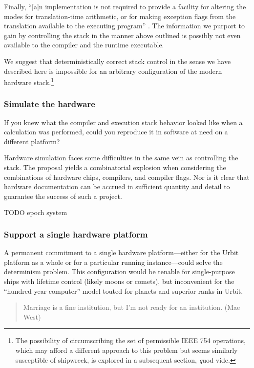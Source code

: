 \documentclass[twoside]{article}
\begin{document}
Finally, “[a]n implementation is not required to provide a facility for altering the modes for translation-time arithmetic, or for making exception flags from the translation available to the executing program” \citep[p.~200]{Jones2008}.  The information we purport to gain by controlling the stack in the manner above outlined is possibly not even available to the compiler and the runtime executable.

We suggest that deterministically correct stack control in the sense we have described here is impossible for an arbitrary configuration of the modern hardware stack.\footnote{The possibility of circumscribing the set of permissible IEEE 754 operations, which may afford a different approach to this problem but seems similarly susceptible of shipwreck, is explored in a subsequent section, {\emph quod vide}.}

\subsubsection{Simulate the hardware}

If you knew what the compiler and execution stack behavior looked like when a calculation was performed, could you reproduce it in software at need on a different platform?

Hardware simulation faces some difficulties in the same vein as controlling the stack.  The proposal yields a combinatorial explosion when considering the combinations of hardware chips, compilers, and compiler flags.  Nor is it clear that hardware documentation can be accrued in sufficient quantity and detail to guarantee the success of such a project.

TODO
epoch system

\subsubsection{Support a single hardware platform}

A permanent commitment to a single hardware platform—either for the Urbit platform as a whole or for a particular running instance—could solve the determinism problem.  This configuration would be tenable for single-purpose ships with lifetime control (likely moons or comets), but inconvenient for the “hundred-year computer” model touted for planets and superior ranks in Urbit.

\begin{quote}
Marriage is a fine institution, but I'm not ready for an institution.  (Mae West)
\end{quote}
\end{document}
